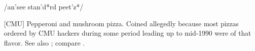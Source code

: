  /an'see stan'd*rd peet'z*/

[CMU] Pepperoni and mushroom pizza. Coined allegedly because most pizzas ordered by CMU hackers during some period leading up to mid-1990
were of that flavor. See also ; compare .

